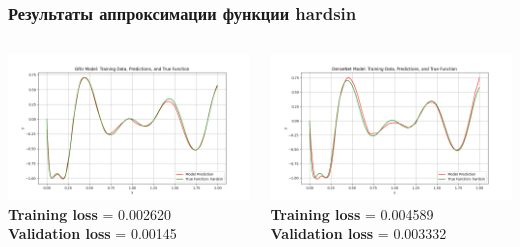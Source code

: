 \documentclass
  [ russian
  , aspectratio=1610 %
  ] {beamer}
\begin{document}
\begin{frame}
    \frametitle{Результаты аппроксимации функции hardsin}
    \begin{columns}
        \begin{column}{0.5\textwidth}
            \centering
            \includegraphics[width=1.1\textwidth]{figures/ch_hardsin_500eph_gru_apr_plot.png}
            \vspace{0.3cm}
            \textbf{Training loss} = 0.002620 \\
            \textbf{Validation loss} = 0.00145
        \end{column}
        \begin{column}{0.5\textwidth}
            \centering
            \includegraphics[width=1.1\textwidth]{figures/ch_hardsin_500eph_dense_apr_plot.png}
            \vspace{0.3cm}
            \textbf{Training loss} = 0.004589 \\
            \textbf{Validation loss} = 0.003332
        \end{column}
    \end{columns}
\end{frame}
\end{document}
